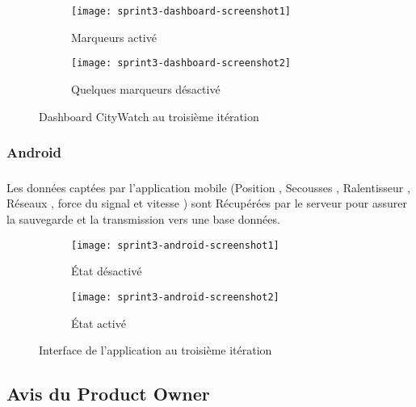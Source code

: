 \begin{figure}[htbp]
\centering
    \begin{subfigure}{.8\textwidth}
    \centering
  \centering
  \texttt{[image: sprint3-dashboard-screenshot1]}
  \caption{Marqueurs activé}
  \label{fig:sprint3-dashboard-screenshot1}
\end{subfigure}
\begin{subfigure}{.8\textwidth}
    \centering
  \centering
  \texttt{[image: sprint3-dashboard-screenshot2]}
  \caption{Quelques marqueurs désactivé}
  \label{sprint3-dashboard-screenshot2}
\end{subfigure}
\caption{Dashboard CityWatch au troisième itération}
\end{figure}
\clearpage

\subsubsection{Android}

\subsubsection*{}
Les données captées par l'application mobile (Position , Secousses , Ralentisseur , Réseaux , force du 
signal et vitesse ) sont Récupérées par le serveur pour assurer la sauvegarde et la transmission vers une 
base données.\\

\begin{figure}[htbp]
\centering
    \begin{subfigure}{.45\textwidth}
    \centering
  \centering
  \texttt{[image: sprint3-android-screenshot1]}
  \caption{État désactivé}
  \label{fig:sprint3-android-screenshot1}
\end{subfigure}
\begin{subfigure}{.45\textwidth}
    \centering
  \centering
  \texttt{[image: sprint3-android-screenshot2]}
  \caption{État activé}
  \label{fig:sprint3-android-screenshot2}
\end{subfigure}
\caption{Interface de l'application au troisième itération}
\end{figure}
\clearpage

\subsection{Avis du Product Owner}

